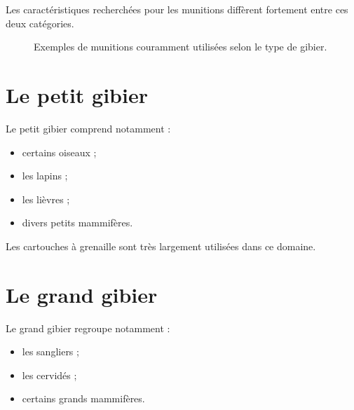 Les caractéristiques recherchées pour les munitions diffèrent fortement entre
ces deux catégories.

\begin{figure}[htbp]
\centering


\caption{Exemples de munitions couramment utilisées selon le type de gibier.}
\label{fig:petit_grand_gibier}

\end{figure}

\section{Le petit gibier}

Le petit gibier comprend notamment :

\begin{itemize}
    \item certains oiseaux ;
    \item les lapins ;
    \item les lièvres ;
    \item divers petits mammifères.
\end{itemize}

Les cartouches à grenaille sont très largement utilisées dans ce domaine.

\section{Le grand gibier}

Le grand gibier regroupe notamment :

\begin{itemize}
    \item les sangliers ;
    \item les cervidés ;
    \item certains grands mammifères.
\end{itemize}

